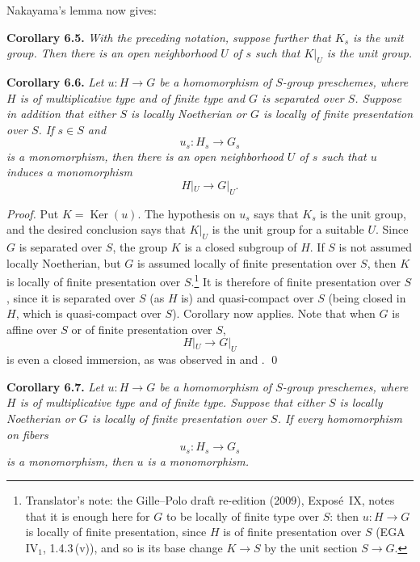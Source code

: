 Nakayama's lemma now gives:

\medskip
\noindent{}\textbf{Corollary 6.5.}
\textit{With the preceding notation, suppose further that \(K_s\) is
the unit group. Then there is an open neighborhood \(U\) of \(s\) such that
\(K|_U\) is the unit group.}

\medskip
\noindent{}\textbf{Corollary 6.6.}
\textit{Let \(u:H\to G\) be a homomorphism of \(S\)-group preschemes,
where \(H\) is of multiplicative type and of finite type and \(G\) is
separated over \(S\). Suppose in addition that either \(S\) is locally
Noetherian or \(G\) is locally of finite presentation over
\(S\).
If \(s\in S\) and
\[
  u_s:H_s\longrightarrow G_s
\]
is a monomorphism, then there is an open neighborhood \(U\) of \(s\)
such that \(u\) induces a monomorphism
\[
  H|_U\longrightarrow G|_U.
\]}

\emph{Proof.}
Put \(K=\operatorname{Ker}(u)\). The hypothesis on \(u_s\) says that
\(K_s\) is the unit group, and the desired conclusion says that
\(K|_U\) is the unit group for a suitable \(U\). Since \(G\) is
separated over \(S\), the group \(K\) is a closed subgroup of \(H\).
If \(S\) is not assumed locally Noetherian, but \(G\) is assumed locally
of finite presentation over \(S\), then \(K\) is locally of finite
presentation over \(S\).\footnote{Translator's note: the Gille--Polo draft
re-edition (2009), Expos\'e~IX, notes that it is enough here for \(G\) to be
locally of finite type over \(S\): then \(u:H\to G\) is locally of finite
presentation, since \(H\) is of finite presentation over \(S\) (EGA
IV\(_1\), 1.4.3\,(v)), and so is its base change \(K\to S\) by the unit
section \(S\to G\).} It is therefore of finite
presentation over \(S\), since it is separated over \(S\) (as \(H\)
is) and quasi-compact over \(S\) (being closed in \(H\), which is
quasi-compact over \(S\)). Corollary
 now applies. Note that when
\(G\) is affine over \(S\) or of finite presentation over \(S\),
\[
  H|_U\longrightarrow G|_U
\]
is even a closed immersion, as was observed in  and
. \qed

\medskip
\noindent{}\textbf{Corollary 6.7.}
\textit{Let \(u:H\to G\) be a homomorphism of \(S\)-group preschemes,
where \(H\) is of multiplicative type and of finite type. Suppose that
either \(S\) is locally Noetherian or \(G\) is locally of finite
presentation over \(S\). If every homomorphism on fibers
\[
  u_s:H_s\longrightarrow G_s
\]
is a monomorphism, then \(u\) is a monomorphism.}

